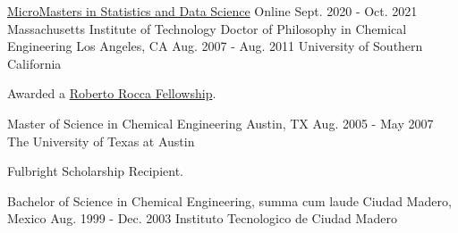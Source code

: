 

\begin{cventries}

  \cventry
    {\href{https://credentials.edx.org/credentials/00b31fd966034e6ab9e35f30be032e2b/}{MicroMasters in Statistics and Data Science}} %
    {Online} %
    {Sept. 2020 - Oct. 2021} %
    {Massachusetts Institute of Technology} %
    {}%
\cventry
    {Doctor of Philosophy in Chemical Engineering} %
    {Los Angeles, CA} %
    {Aug. 2007 - Aug. 2011} %
    {University of Southern California} %
    {
      \begin{cvitems} %
        \item  Awarded a {\href{http://www.robertorocca.org/en/fellowships/fellows07.aspx}{Roberto Rocca Fellowship}}.
      \end{cvitems}
    }%
  \cventry
      {Master of Science in Chemical Engineering} %
      {Austin, TX} %
      {Aug. 2005 - May 2007} %
      {The University of Texas at Austin} %
      {
        \begin{cvitems} %
          \item Fulbright Scholarship Recipient.
        \end{cvitems}
      }%
  \cventry
      {Bachelor of Science in Chemical Engineering, summa cum laude} %
      {Ciudad Madero, Mexico} %
      {Aug. 1999 - Dec. 2003} %
      {Instituto Tecnologico de Ciudad Madero} %
      {}
\end{cventries}
